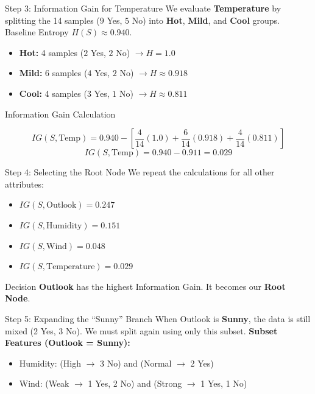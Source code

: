 \documentclass[aspectratio=169]{beamer}
\begin{document}
\begin{frame}{Step 3: Information Gain for Temperature}
    \footnotesize
    We evaluate \textbf{Temperature} by splitting the 14 samples ($9$ Yes, $5$ No) into \textbf{Hot}, \textbf{Mild}, and \textbf{Cool} groups.
    Baseline Entropy $H(S) \approx 0.940$.

    \begin{itemize}
        \item \textbf{Hot:} 4 samples ($2$ Yes, $2$ No) $\rightarrow H = 1.0$
        \item \textbf{Mild:} 6 samples ($4$ Yes, $2$ No) $\rightarrow H \approx 0.918$
        \item \textbf{Cool:} 4 samples ($3$ Yes, $1$ No) $\rightarrow H \approx 0.811$
    \end{itemize}

    \begin{block}{Information Gain Calculation}

        \[ IG(S, \text{Temp}) = 0.940 - \left[ \frac{4}{14}(1.0) + \frac{6}{14}(0.918) + \frac{4}{14}(0.811) \right] \]
        \[ IG(S, \text{Temp}) = 0.940 - 0.911 = \mathbf{0.029} \]
    \end{block}
\end{frame}

\begin{frame}{Step 4: Selecting the Root Node}
    We repeat the calculations for all other attributes:
    \begin{itemize}
        \item $IG(S, \text{Outlook}) = 0.247$
        \item $IG(S, \text{Humidity}) = 0.151$
        \item $IG(S, \text{Wind}) = 0.048$
        \item $IG(S, \text{Temperature}) = 0.029$
    \end{itemize}
    \begin{block}{Decision}
    \textbf{Outlook} has the highest Information Gain. It becomes our \textbf{Root Node}.
    \end{block}
\end{frame}

\begin{frame}{Step 5: Expanding the ``Sunny'' Branch}
    When Outlook is \textbf{Sunny}, the data is still mixed (2 Yes, 3 No). We must split again using only this subset.
    \vfill
    \textbf{Subset Features (Outlook = Sunny):}
    \begin{itemize}
        \item Humidity: (High $\rightarrow$ 3 No) and (Normal $\rightarrow$ 2 Yes)
        \item Wind: (Weak $\rightarrow$ 1 Yes, 2 No) and (Strong $\rightarrow$ 1 Yes, 1 No)
    \end{itemize}
\end{frame}
\end{document}
